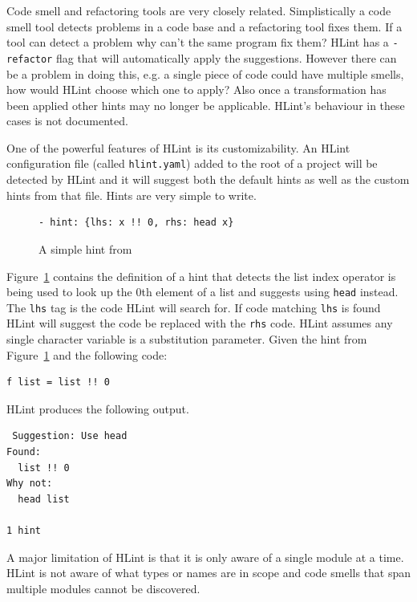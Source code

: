 Code smell and refactoring tools are very closely related. Simplistically a code smell tool detects problems in a code base and a refactoring tool fixes them. If a tool can detect a problem why can't the same program fix them? HLint has a \texttt{-refactor} flag that will automatically apply the suggestions. However there can be a problem in doing this, e.g. a single piece of code could have multiple smells, how would HLint choose which one to apply? Also once a transformation has been applied other hints may no longer be applicable. HLint's behaviour in these cases is not documented.

One of the powerful features of HLint is its customizability. An HLint configuration file (called \texttt{hlint.yaml}) added to the root of a project   will be detected by HLint and it will suggest both the default hints as well as the custom hints from that file. Hints are very simple to write.

\begin{figure}[t]
\begin{lstlisting}
- hint: {lhs: x !! 0, rhs: head x}
\end{lstlisting}
\caption{A simple hint from~\citep{hlint}}
\label{lstHint}
\end{figure}

Figure~\ref{lstHint} contains the definition of a hint that detects the list index operator is being used to look up the 0th element of a list and suggests using \texttt{head} instead. The \texttt{lhs} tag is the code HLint will search for. If code matching \texttt{lhs} is found  HLint will suggest the code be replaced with the \texttt{rhs} code. HLint assumes any single character variable is a substitution parameter. Given the hint from Figure~\ref{lstHint} and the following code:

\begin{lstlisting}
f list = list !! 0
\end{lstlisting}

HLint produces the following output.

\begin{lstlisting}
 Suggestion: Use head
Found:
  list !! 0
Why not:
  head list

1 hint
\end{lstlisting}

A major limitation of HLint is that it is only aware of a single module at a time. HLint is not aware of what types or names are in scope and code smells that span multiple modules cannot be discovered.


